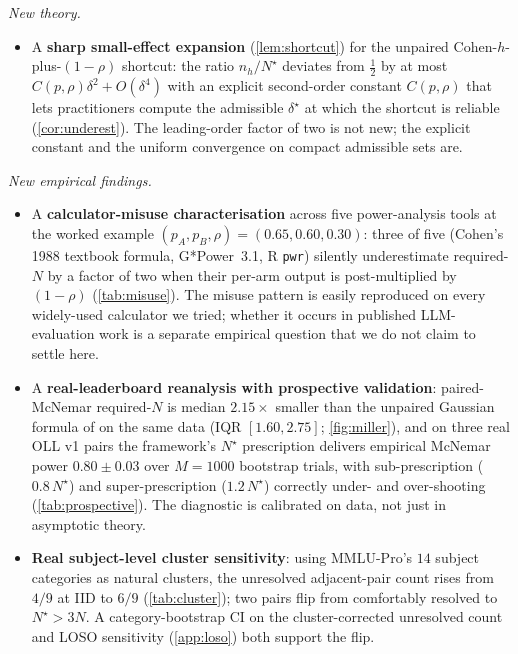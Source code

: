 \documentclass{article}
\theoremstyle{plain}
\theoremstyle{definition}
\begin{document}
\noindent\emph{New theory.}
\begin{itemize}[leftmargin=*, itemsep=0pt, topsep=2pt]
\item A \textbf{sharp small-effect expansion} (\cref{lem:shortcut}) for the unpaired Cohen-$h$-plus-$(1{-}\rho)$ shortcut: the ratio $n_h/N^{\star}$ deviates from $\tfrac12$ by at most $C(p,\rho)\delta^2 + O(\delta^4)$ with an explicit second-order constant $C(p,\rho)$ that lets practitioners compute the admissible $\delta^{\star}$ at which the shortcut is reliable (\cref{cor:underest}). The leading-order factor of two is not new; the explicit constant and the uniform convergence on compact admissible sets are.
\end{itemize}

\noindent\emph{New empirical findings.}
\begin{itemize}[leftmargin=*, itemsep=0pt, topsep=2pt]
\item A \textbf{calculator-misuse characterisation} across five power-analysis tools at the worked example $(p_A,p_B,\rho){=}(0.65,0.60,0.30)$: three of five (Cohen's 1988 textbook formula, G*Power~3.1, R \texttt{pwr}) silently underestimate required-$N$ by a factor of two when their per-arm output is post-multiplied by $(1{-}\rho)$ (\cref{tab:misuse}). The misuse pattern is easily reproduced on every widely-used calculator we tried; whether it occurs in published LLM-evaluation work is a separate empirical question that we do not claim to settle here.
\item A \textbf{real-leaderboard reanalysis with prospective validation}: paired-McNemar required-$N$ is median $2.15{\times}$ smaller than the unpaired Gaussian formula of \citet{miller2024errorbars} on the same data (IQR $[1.60,2.75]$; \cref{fig:miller}), and on three real OLL v1 pairs the framework's $N^{\star}$ prescription delivers empirical McNemar power $0.80\pm 0.03$ over $M{=}1000$ bootstrap trials, with sub-prescription ($0.8\,N^{\star}$) and super-prescription ($1.2\,N^{\star}$) correctly under- and over-shooting (\cref{tab:prospective}). The diagnostic is calibrated on data, not just in asymptotic theory.
\item \textbf{Real subject-level cluster sensitivity}: using MMLU-Pro's $14$ subject categories as natural clusters, the unresolved adjacent-pair count rises from $4/9$ at IID to $6/9$ (\cref{tab:cluster}); two pairs flip from comfortably resolved to $N^{\star} > 3N$. A category-bootstrap CI on the cluster-corrected unresolved count and LOSO sensitivity (\cref{app:loso}) both support the flip.
\end{itemize}
\end{document}
